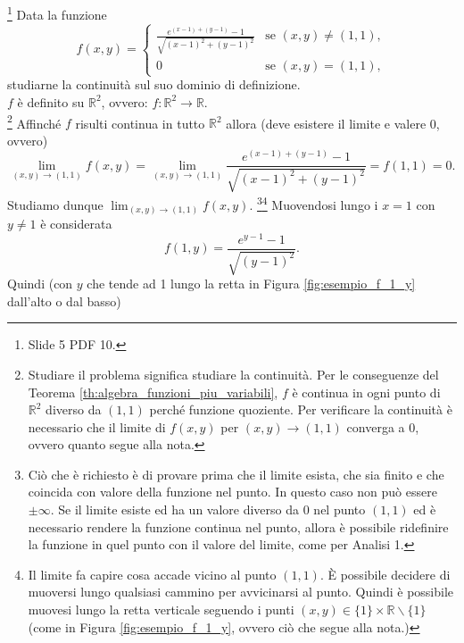 \begin{example}\footnote{Slide 5 PDF 10.}
    Data la funzione
    \begin{equation*}
        f(x,y)=
        \begin{cases}
            \frac{e^{(x-1)+(y-1)}-1}{\sqrt{(x-1)^2+(y-1)^2}} &\text{se } (x,y)\neq (1,1),\\
            0 &\text{se } (x,y)=(1,1),
        \end{cases}
    \end{equation*}
    studiarne la continuità sul suo dominio di definizione.\\
    $f$ è definito su $\mathbb R^2$, ovvero: $f\colon\mathbb R^2\rightarrow\mathbb R$.\\
    \footnote{Studiare il problema significa studiare la continuità. Per le conseguenze del Teorema \ref{th:algebra_funzioni_piu_variabili}, $f$ è continua in ogni punto di $\mathbb R^2$ diverso da $(1,1)$ perché funzione quoziente. Per verificare la continuità è necessario che il limite di $f(x,y)$ per $(x,y)\rightarrow (1,1)$ converga a 0, ovvero quanto segue alla nota.} Affinché $f$ risulti continua in tutto $\mathbb R^2$ allora (deve esistere il limite e valere 0, ovvero)
    \begin{equation*}
        \lim_{(x,y)\rightarrow(1,1)} f(x,y)=\lim_{(x,y)\rightarrow(1,1)}\frac{e^{(x-1)+(y-1)}-1}{\sqrt{(x-1)^2+(y-1)^2}}=f(1,1)=0.
    \end{equation*}
    Studiamo dunque $\lim_{(x,y)\rightarrow(1,1)}f(x,y)$. \footnote{Ciò che è richiesto è di provare prima che il limite esista, che sia finito e che coincida con valore della funzione nel punto. In questo caso non può essere $\pm\infty$. Se il limite esiste ed ha un valore diverso da 0 nel punto $(1,1)$ ed è necessario rendere la funzione continua nel punto, allora è possibile ridefinire la funzione in quel punto con il valore del limite, come per Analisi 1.}\footnote{Il limite fa capire cosa accade vicino al punto $(1,1)$. È possibile decidere di muoversi lungo qualsiasi cammino per avvicinarsi al punto. Quindi è possibile muovesi lungo la retta verticale seguendo i punti $(x,y)\in\{1\}\times\mathbb R\backslash\{1\}$ (come in Figura \ref{fig:esempio_f_1_y}, ovvero ciò che segue alla nota.)} Muovendosi lungo i $x=1$ con $y\neq 1$ è considerata
    \begin{equation*}
        f(1, y)=\frac{e^{y-1}-1}{\sqrt{(y-1)^2}}.
    \end{equation*}
    Quindi (con $y$ che tende ad 1 lungo la retta in Figura \ref{fig:esempio_f_1_y} dall'alto o dal basso)

\end{example}

